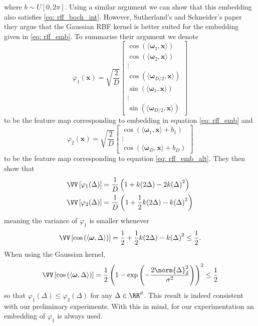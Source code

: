 where $b \sim U \left[ 0,2 \pi \right]$. Using a similar argument we can show that this embedding also satisfies \ref{eq: rff_boch_int}. However, Sutherland's and Schneider's paper \cite{sutherland2015error} they argue that the Gaussian RBF kernel is better suited for the embedding given in \ref{eq: rff_emb}. To summarise their argument we denote
\begin{equation} \label{eq: rff_feat_map_1}
    \varphi_1 (\bm{x}) = \sqrt{\frac{2}{D}}
    \begin{bmatrix}
        \cos \left( \langle \bm{\omega}_{1} , \bm{x} \rangle \right)   \\
        \cos \left( \langle \bm{\omega}_{2} , \bm{x} \rangle \right)   \\
        \vdots                                                         \\
        \cos \left( \langle \bm{\omega}_{D/2} , \bm{x} \rangle \right) \\
        \sin \left( \langle \bm{\omega}_{1} , \bm{x} \rangle \right)   \\
        \vdots                                                         \\
        \sin \left( \langle \bm{\omega}_{D/2} , \bm{x} \rangle \right)
    \end{bmatrix}
\end{equation}
to be the feature map corresponding to embedding in equation \ref{eq: rff_emb} and
\begin{equation} \label{eq: rff_feat_map_2}
    \varphi_2 (\bm{x}) = \sqrt{\frac{2}{D}}
    \begin{bmatrix}
        \cos \left( \langle \bm{\omega}_{1} , \bm{x} \rangle + b_1 \right) \\
        \vdots                                                             \\
        \cos \left( \langle \bm{\omega}_{D} , \bm{x} \rangle + b_D \right)
    \end{bmatrix}
\end{equation}
to be the feature map corresponding to equation \ref{eq: rff_emb_alt}. They then show that
\begin{align*}
    \VV \left[ \varphi_1 (\Delta) \right] & = \frac{1}{D} \left( 1 + k (2 \Delta) - 2 {k( \Delta)}^2 \right)           \\
    \VV \left[ \varphi_2 (\Delta) \right] & = \frac{1}{D} \left( 1 + \frac{1}{2} k (2 \Delta) - {k( \Delta)}^2 \right)
\end{align*}
meaning the variance of $\varphi_1$ is smaller whenever
\[
    \VV \left[ \cos \left( \langle \bm{\omega} , \Delta \rangle \right) \right] = \frac{1}{2} + \frac{1}{2} k (2 \Delta) - {k( \Delta)}^2 \leq \frac{1}{2} .
\]
When using the Gaussian kernel,
\[
    \VV \left[ \cos \left( \langle \bm{\omega} , \Delta \rangle \right) \right] = \frac{1}{2} \left( 1 - \exp \left( - \frac{2\norm{\Delta}^2_2}{\sigma^2} \right) \right)^2 \leq \frac{1}{2}
\]
so that $\varphi_1 (\Delta) \leq \varphi_2 (\Delta)$ for any $\Delta \in \RR^d$. This result is indeed consistent with our preliminary experiments. With this in mind, for our experimentation an embedding of $\varphi_1$ is always used.

